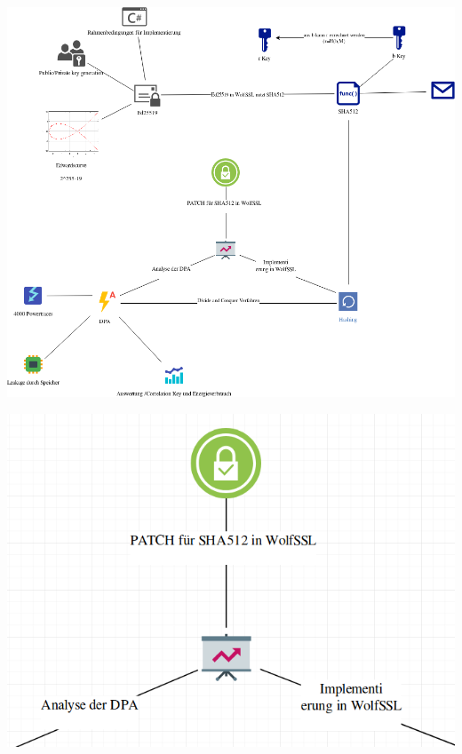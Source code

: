 \documentclass[
  9pt,
  ignorenonframetext,
  aspectratio=169,
]{beamer}
\begin{document}
\begin{frame}{}
\protect\hypertarget{section-6}{}
\includegraphics{Abbildungen/ITSEC(1).png}
\end{frame}

\begin{frame}{}
\protect\hypertarget{section-7}{}
\includegraphics{Abbildungen/Punkt5.png}
\end{frame}
\end{document}
